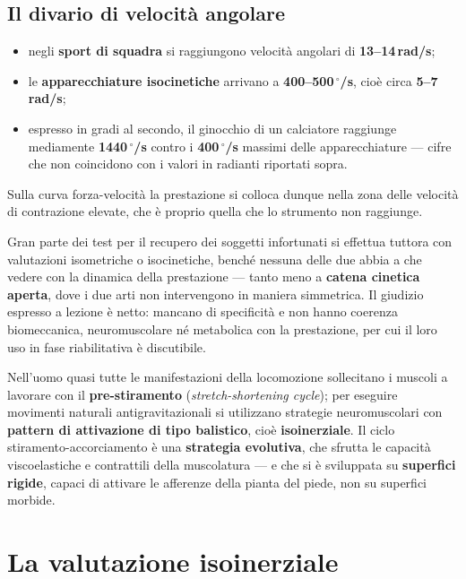 \subsection{Il divario di velocità angolare}

\begin{itemize}
  \item negli \textbf{sport di squadra} si raggiungono velocità angolari di \textbf{13--14\,rad/s};
  \item le \textbf{apparecchiature isocinetiche} arrivano a \textbf{400--500\,$^\circ$/s}, cioè
    circa \textbf{5--7\,rad/s};
  \item espresso in gradi al secondo, il ginocchio di un calciatore raggiunge mediamente
    \textbf{1440\,$^\circ$/s} contro i \textbf{400\,$^\circ$/s} massimi delle apparecchiature ---
    cifre che non coincidono con i valori in radianti riportati sopra.
\end{itemize}
Sulla curva forza-velocità la prestazione si colloca dunque nella zona delle velocità di
contrazione elevate, che è proprio quella che lo strumento non raggiunge.

Gran parte dei test per il recupero dei soggetti infortunati si effettua tuttora con valutazioni
isometriche o isocinetiche, benché nessuna delle due abbia a che vedere con la dinamica della
prestazione --- tanto meno a \textbf{catena cinetica aperta}, dove i due arti non intervengono in
maniera simmetrica. Il giudizio espresso a lezione è netto: mancano di specificità e non
hanno coerenza biomeccanica, neuromuscolare né metabolica con la prestazione, per cui il loro uso
in fase riabilitativa è discutibile.

Nell'uomo quasi tutte le manifestazioni della locomozione sollecitano i muscoli a lavorare con il
  \textbf{pre-stiramento} (\textit{stretch-shortening cycle}); per eseguire movimenti naturali
  antigravitazionali si utilizzano strategie neuromuscolari con \textbf{pattern di attivazione di
  tipo balistico}, cioè \textbf{isoinerziale}. Il ciclo stiramento-accorciamento è una
  \textbf{strategia evolutiva}, che sfrutta le capacità viscoelastiche e contrattili della
  muscolatura --- e che si è sviluppata su \textbf{superfici rigide}, capaci di attivare le
  afferenze della pianta del piede, non su superfici morbide.

\section{La valutazione isoinerziale}

